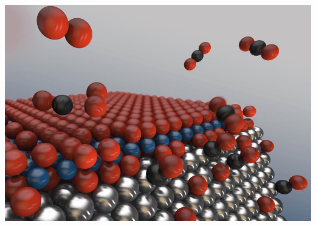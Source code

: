 \documentclass[10pt,t]{beamer}
\begin{document}
\begin{frame}
\begin{columns}
    \includegraphics[width=\textwidth]{nano-3d}
\end{columns}
\end{frame}
\end{document}
